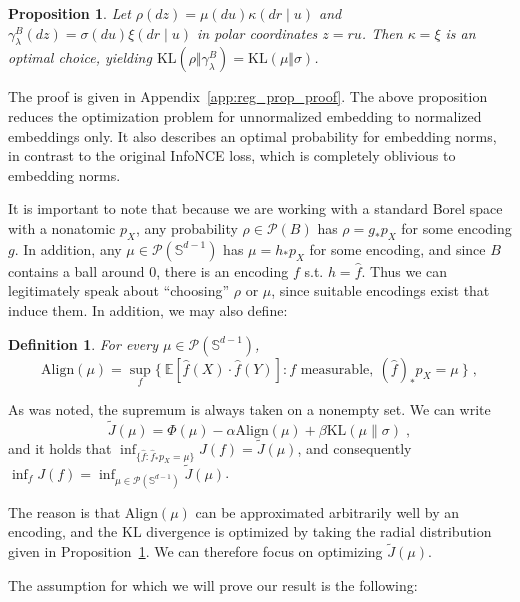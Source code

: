 \documentclass{article}
\newtheorem{definition}{Definition}
\newtheorem{proposition}{Proposition}
\newcommand{\E}{\mathbb{E}}
\newcommand{\KL}{\mathrm{KL}}
\newcommand{\Sph}{\mathbb{S}}
\begin{document}
\begin{proposition}\label{prop:radial optimal}
 Let $\rho(dz)=\mu(du)\kappa(dr\mid u)$ and $\gamma_\lambda^{B}(dz)=\sigma(du)\xi(dr\mid u)$ in polar coordinates $z=ru$. Then $\kappa = \xi$ is an optimal choice, yielding $\KL(\rho\Vert\gamma_\lambda^{B})=\KL(\mu\Vert\sigma)$. 
 \end{proposition}

The proof is given in Appendix~\ref{app:reg_prop_proof}. The above proposition reduces the optimization problem for unnormalized embedding to normalized embeddings only. It also describes an optimal probability for embedding norms, in contrast to the original InfoNCE loss, which is completely oblivious to embedding norms. 

It is important to note that because we are working with a standard Borel space with a nonatomic $p_X$, any probability $\rho\in \mathcal{P}(B)$ has $\rho = g_*p_X$ for some encoding $g$. In addition, any $\mu\in\mathcal{P}(\Sph^{d-1})$ has $\mu = h_*p_X$ for some encoding, and since $B$ contains a ball around $0$, there is an encoding $f$ s.t. $h=\hat{f}$. Thus we can legitimately speak about ``choosing'' $\rho$ or $\mu$, since suitable encodings exist that induce them. In addition, we may also define:

\begin{definition}
For every $\mu\in\mathcal{P}(\Sph^{d-1})$,
\begin{equation}
\mathrm{Align}(\mu)=\sup_f\big\{\ \E[\hat f(X)\cdot\hat f(Y)]:f\text{ measurable},\ (\hat f)_*p_X=\mu\ \big\}\;,
\end{equation}
\end{definition}
As was noted, the supremum is always taken on a nonempty set. 
We can write
\begin{equation}\label{eq:with kl2}
\tilde{J}(\mu)
=\Phi(\mu)-\alpha\mathrm{Align}(\mu)
+\beta \KL(\mu\|\sigma)\;,
\end{equation}
and it holds that $\inf_{\{\hat{f}:\hat{f}_*p_X = \mu\}} J(f) = \tilde{J}(\mu)$, and consequently $\inf_f J(f) = \inf_{\mu\in \mathcal{P}(\Sph^{d-1})}\tilde{J}(\mu)$.

% 
%     
%
% 
% 
%   
% 
%
The reason is that $\mathrm{Align}(\mu)$ can be approximated arbitrarily well by an encoding, and the $\KL$ divergence is optimized by taking the radial distribution given in Proposition~\ref{prop:radial optimal}. We can therefore focus on optimizing $\tilde{J}(\mu)$. 

The assumption for which we will prove our result is the following:
\end{document}
